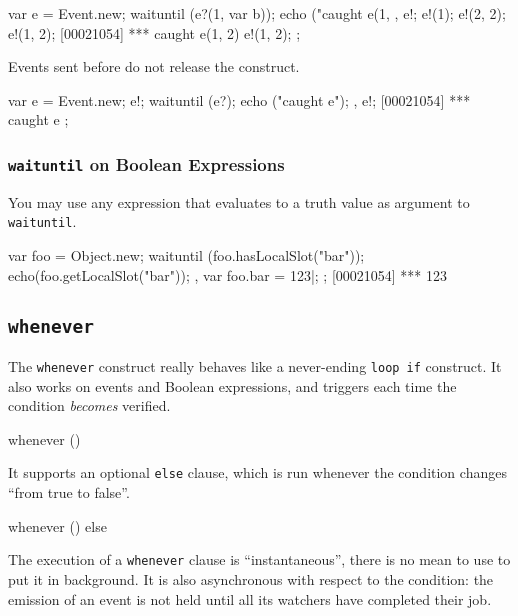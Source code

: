 \begin{urbiscript}
{
  var e = Event.new;
  {
    waituntil (e?(1, var b));
    echo ("caught e(1, %
  },
  e!;
  e!(1);
  e!(2, 2);
  e!(1, 2);
[00021054] *** caught e(1, 2)
  e!(1, 2);
};
\end{urbiscript}

Events sent before do not release the construct.

\begin{urbiscript}
{
  var e = Event.new;
  e!;
  {
    waituntil (e?);
    echo ("caught e");
  },
  e!;
[00021054] *** caught e
};
\end{urbiscript}

\subsubsection{\lstinline'waituntil' on Boolean Expressions}

You may use any expression that evaluates to a truth value as argument
to \lstinline'waituntil'.

\begin{urbiscript}
{
  var foo = Object.new;
  {
    waituntil (foo.hasLocalSlot("bar"));
    echo(foo.getLocalSlot("bar"));
  },
  var foo.bar = 123|;
};
[00021054] *** 123
\end{urbiscript}

\subsection{\lstinline|whenever|}
\label{sec:lang:whenever}

The \lstinline|whenever| construct really behaves like a never-ending
\lstinline|loop if| construct.  It also works on events and Boolean
expressions, and triggers each time the condition \emph{becomes}
verified.

\begin{urbiunchecked}
whenever ()
\end{urbiunchecked}

It supports an optional \lstinline|else| clause, which is run whenever
the condition changes ``from true to false''.

\begin{urbiunchecked}
whenever ()
else
\end{urbiunchecked}

The execution of a \lstinline|whenever| clause is ``instantaneous'',
there is no mean to use \samp{,} to put it in background.  It is also
asynchronous with respect to the condition: the emission of an event
is not held until all its watchers have completed their job.

